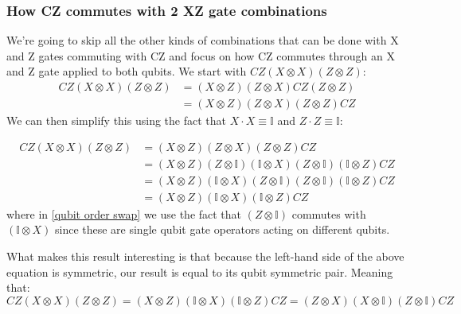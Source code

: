\subsubsection{How CZ commutes with 2 XZ gate combinations}
We're going to skip all the other kinds of combinations that can be done with X and Z gates commuting with CZ and focus on how CZ commutes through an X and Z gate applied to both qubits. We start with $CZ(X\otimes X)(Z\otimes Z)$:
\begin{align}
    CZ(X\otimes X)(Z\otimes Z) & = (X\otimes Z)(Z\otimes X)CZ(Z\otimes Z)
    \\ & = (X\otimes Z)(Z\otimes X)(Z\otimes Z)CZ
\end{align}
We can then simplify this using the fact that $X \cdot X \equiv \mathbb{I}$ and $Z \cdot Z \equiv \mathbb{I}$:

\begin{align}
    CZ(X\otimes X)(Z\otimes Z) & = (X\otimes Z)(Z\otimes X)(Z\otimes Z)CZ
    \\ & = (X\otimes Z)(Z\otimes\mathbb{I})(\mathbb{I}\otimes X)(Z\otimes\mathbb{I})(\mathbb{I}\otimes Z)CZ
    \\ & = (X\otimes Z)(\mathbb{I}\otimes X)(Z\otimes\mathbb{I})(Z\otimes\mathbb{I})(\mathbb{I}\otimes Z)CZ \label{qubit order swap}
    \\ & = (X\otimes Z)(\mathbb{I}\otimes X)(\mathbb{I}\otimes Z)CZ
\end{align}
where in \ref{qubit order swap} we use the fact that $(Z\otimes\mathbb{I})$ commutes with $(\mathbb{I}\otimes X)$ since these are single qubit gate operators acting on different qubits.
\par
What makes this result interesting is that because the left-hand side of the above equation is symmetric, our result is equal to its qubit symmetric pair. Meaning that:
\begin{equation}
     CZ(X\otimes X)(Z\otimes Z) = (X\otimes Z)(\mathbb{I}\otimes X)(\mathbb{I}\otimes Z)CZ = (Z\otimes X)(X\otimes \mathbb{I})(Z\otimes \mathbb{I})CZ
\end{equation}